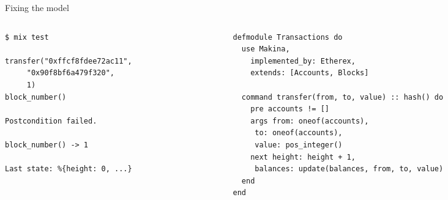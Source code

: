 \documentclass[aspectratio=169, 10pt]{beamer}
\begin{document}
\begin{frame}[label={sec:org8544ec2},fragile]{Fixing the model}
 \begin{columns}
\begin{column}{0.44\columnwidth}
\lstset{language=bash,label= ,caption= ,captionpos=b,numbers=none,style=shell}
\begin{lstlisting}
$ mix test

transfer("0xffcf8fdee72ac11",
	 "0x90f8bf6a479f320",
	 1)
block_number()

Postcondition failed.

block_number() -> 1

Last state: %{height: 0, ...}
\end{lstlisting}
\end{column}

\begin{column}{0.52\columnwidth}
\lstset{language=elixir,label= ,caption= ,captionpos=b,numbers=none,style=display}
\begin{lstlisting}
defmodule Transactions do
  use Makina,
    implemented_by: Etherex,
    extends: [Accounts, Blocks]

  command transfer(from, to, value) :: hash() do
    pre accounts != []
    args from: oneof(accounts),
	 to: oneof(accounts),
	 value: pos_integer()
    next height: height + 1,
	 balances: update(balances, from, to, value)
  end
end
\end{lstlisting}
\end{column}
\end{columns}
\end{frame}
\end{document}
